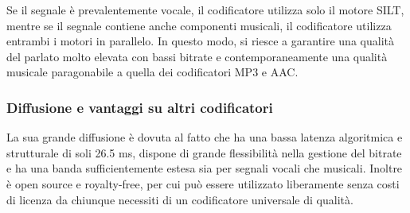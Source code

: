 \noindent
Se il segnale è prevalentemente vocale, il codificatore utilizza solo il motore SILT, mentre se il segnale contiene anche
componenti musicali, il codificatore utilizza entrambi i motori in parallelo. In questo modo, si riesce a garantire una
qualità del parlato molto elevata con bassi bitrate e contemporaneamente una qualità musicale paragonabile a quella dei
codificatori MP3 e AAC.

\subsubsection*{Diffusione e vantaggi su altri codificatori}
La sua grande diffusione è dovuta al fatto che ha una bassa latenza algoritmica e strutturale di soli 26.5 ms, dispone di
grande flessibilità nella gestione del bitrate e ha una banda sufficientemente estesa sia per segnali vocali che musicali.
Inoltre è open source e royalty-free, per cui può essere utilizzato liberamente senza costi di licenza da chiunque necessiti
di un codificatore universale di qualità.
